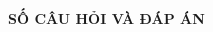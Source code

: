\documentclass[11pt]{article}
\begin{document}
\setlength{\baselineskip}{12truept}
\def\v#1{\overrightarrow{#1}} %
\demexcel
{}
\lamtieude
\indebai
{}
\label{dbPage}
\newpage
\thispagestyle{empty}
\lamtieude
\dempa
{}
\begin{center}
\textbf{SỐ CÂU HỎI VÀ ĐÁP ÁN}
\indapanlietke
\begin{multicols}{5}
\begin{enumerate}[\socau]
\foreachproblem[ma100]{\item\thisproblem}
 \end{enumerate}
\end{multicols}
\end{center}
\end{document}
